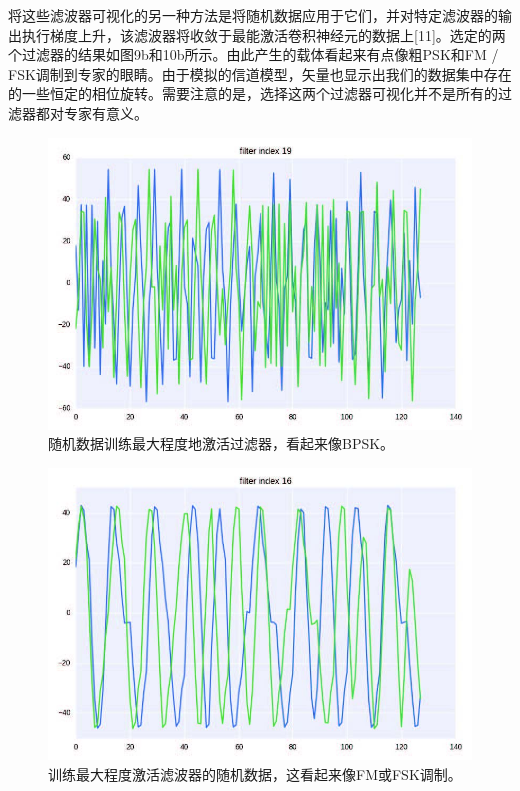 将这些滤波器可视化的另一种方法是将随机数据应用于它们，并对特定滤波器的输出执行梯度上升，该滤波器将收敛于最能激活卷积神经元的数据上[11]。选定的两个过滤器的结果如图9b和10b所示。由此产生的载体看起来有点像粗PSK和FM / FSK调制到专家的眼睛。由于模拟的信道模型，矢量也显示出我们的数据集中存在的一些恒定的相位旋转。需要注意的是，选择这两个过滤器可视化并不是所有的过滤器都对专家有意义。\par

\begin{figure}[!h]
	\centering
	\includegraphics[scale=1]{figures/chapter_5/fig9_b}
	\caption{随机数据训练最大程度地激活过滤器，看起来像BPSK。}
\end{figure}
\begin{figure}[!h]
	\centering
	\includegraphics[scale=1]{figures/chapter_5/fig10_b}
	\caption{训练最大程度激活滤波器的随机数据，这看起来像FM或FSK调制。}
\end{figure}

